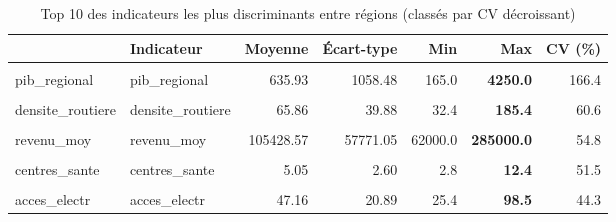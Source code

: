 \documentclass[
]{article}
\begin{document}
\begin{longtable}[t]{llrrr>{}rr}
\caption{\label{tab:stats-desc}Top 10 des indicateurs les plus discriminants entre régions (classés par CV décroissant)}\\
\toprule
 & Indicateur & Moyenne & Écart-type & Min & Max & CV (\%)\\
\midrule
\cellcolor{gray!10}{densite\_pop} & \cellcolor{gray!10}{densite\_pop} & \cellcolor{gray!10}{458.00} & \cellcolor{gray!10}{1517.35} & \cellcolor{gray!10}{8.0} & \textcolor[HTML]{B92346}{\textbf{\cellcolor{gray!10}{5726.0}}} & \cellcolor{gray!10}{331.3}\\
pib\_regional & pib\_regional & 635.93 & 1058.48 & 165.0 & \textcolor[HTML]{B92346}{\textbf{4250.0}} & 166.4\\
\cellcolor{gray!10}{acces\_internet} & \cellcolor{gray!10}{acces\_internet} & \cellcolor{gray!10}{25.95} & \cellcolor{gray!10}{17.10} & \cellcolor{gray!10}{12.4} & \textcolor[HTML]{B92346}{\textbf{\cellcolor{gray!10}{76.2}}} & \cellcolor{gray!10}{65.9}\\
densite\_routiere & densite\_routiere & 65.86 & 39.88 & 32.4 & \textcolor[HTML]{B92346}{\textbf{185.4}} & 60.6\\
\cellcolor{gray!10}{part\_urbaine} & \cellcolor{gray!10}{part\_urbaine} & \cellcolor{gray!10}{35.94} & \cellcolor{gray!10}{20.20} & \cellcolor{gray!10}{20.5} & \textcolor[HTML]{B92346}{\textbf{\cellcolor{gray!10}{97.2}}} & \cellcolor{gray!10}{56.2}\\
\addlinespace
revenu\_moy & revenu\_moy & 105428.57 & 57771.05 & 62000.0 & \textcolor[HTML]{B92346}{\textbf{285000.0}} & 54.8\\
\cellcolor{gray!10}{taux\_scol\_sec} & \cellcolor{gray!10}{taux\_scol\_sec} & \cellcolor{gray!10}{30.59} & \cellcolor{gray!10}{15.77} & \cellcolor{gray!10}{15.2} & \textcolor[HTML]{B92346}{\textbf{\cellcolor{gray!10}{72.4}}} & \cellcolor{gray!10}{51.5}\\
centres\_sante & centres\_sante & 5.05 & 2.60 & 2.8 & \textcolor[HTML]{B92346}{\textbf{12.4}} & 51.5\\
\cellcolor{gray!10}{tx\_chomage} & \cellcolor{gray!10}{tx\_chomage} & \cellcolor{gray!10}{8.39} & \cellcolor{gray!10}{3.73} & \cellcolor{gray!10}{4.8} & \textcolor[HTML]{B92346}{\textbf{\cellcolor{gray!10}{18.2}}} & \cellcolor{gray!10}{44.5}\\
acces\_electr & acces\_electr & 47.16 & 20.89 & 25.4 & \textcolor[HTML]{B92346}{\textbf{98.5}} & 44.3\\
\bottomrule
\end{longtable}
\endgroup{}
\end{document}
